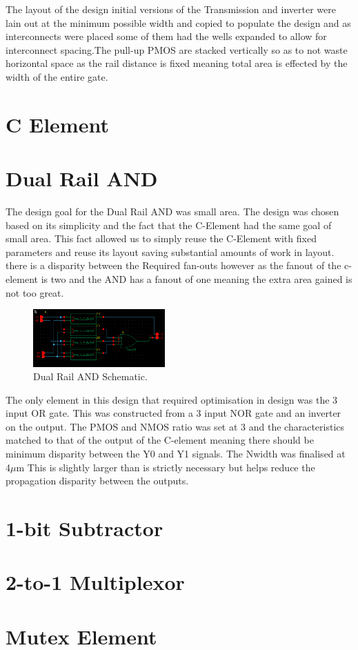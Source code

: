 The layout of the design initial versions of the Transmission and inverter were lain out  at the minimum possible width and copied to populate the design and as interconnects were placed some of them had the wells expanded to allow for interconnect spacing.The pull-up PMOS are stacked vertically so as to not waste horizontal space as the rail distance is fixed meaning total area is effected by the width of the entire gate.

\section{C Element}

\section{Dual Rail AND}
The design goal for the Dual Rail AND was small area. The design was chosen based on its simplicity and the fact that the C-Element had the same goal of small area. This fact allowed us to simply reuse the C-Element with fixed parameters and reuse its layout saving substantial amounts of work in layout. there is a disparity between the Required fan-outs however as the fanout of the c-element is two and the AND has a fanout of one meaning the extra area gained is not too great.

\begin{figure}[h]  
\centering
   \includegraphics[width=0.45\textwidth]{Figures/DualRailANDSchem.png}
\caption{Dual Rail AND Schematic.}
\label {fig:DualRailANDSchem}
\end{figure}

The only element in this design that required optimisation in design was the 3 input OR gate. This was constructed from a 3 input NOR gate and an inverter on the output. The PMOS and NMOS ratio was set at 3 and the characteristics matched to that of the output of the C-element meaning there should be minimum disparity between the Y0 and Y1 signals. The Nwidth was finalised at 4$\mu$m This is slightly larger than is strictly necessary but helps reduce the propagation disparity between the outputs.



\section{1-bit Subtractor}

\section{2-to-1 Multiplexor}

\section{Mutex Element}
